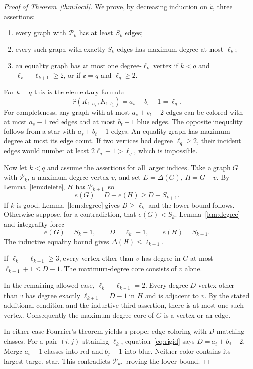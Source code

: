 \documentclass[11pt]{article}
\theoremstyle{remark}\newtheorem{remark}[theorem]{Remark}
\newcommand{\sr}{\widehat r}
\begin{document}
\begin{proof}[Proof of Theorem~\ref{thm:local}]
We prove, by decreasing induction on $k$, three assertions:
\begin{enumerate}
\item every graph with $\mathcal P_k$ has at least $S_k$ edges;
\item every such graph with exactly $S_k$ edges has maximum degree at most $\ell_k$;
\item an equality graph has at most one degree-$\ell_k$ vertex if $k<q$ and $\ell_k-\ell_{k+1}\ge2$, or if $k=q$ and $\ell_q\ge2$.
\end{enumerate}

For $k=q$ this is the elementary formula
\[
 \sr(K_{1,a_s},K_{1,b_t})=a_s+b_t-1=\ell_q.
\]
For completeness, any graph with at most $a_s+b_t-2$ edges can be colored with at most $a_s-1$ red edges and at most $b_t-1$ blue edges. The opposite inequality follows from a star with $a_s+b_t-1$ edges. An equality graph has maximum degree at most its edge count. If two vertices had degree $\ell_q\ge2$, their incident edges would number at least $2\ell_q-1>\ell_q$, which is impossible.

Now let $k<q$ and assume the assertions for all larger indices. Take a graph $G$ with $\mathcal P_k$, a maximum-degree vertex $v$, and set $D=\Delta(G)$, $H=G-v$. By Lemma~\ref{lem:delete}, $H$ has $\mathcal P_{k+1}$, so
\[
 e(G)=D+e(H)\ge D+S_{k+1}.
\]
If $k$ is good, Lemma~\ref{lem:degree} gives $D\ge\ell_k$ and the lower bound follows. Otherwise suppose, for a contradiction, that $e(G)<S_k$. Lemma~\ref{lem:degree} and integrality force
\begin{equation}\label{eq:rigid}
 e(G)=S_k-1,\qquad D=\ell_k-1,\qquad e(H)=S_{k+1}.
\end{equation}
The inductive equality bound gives $\Delta(H)\le\ell_{k+1}$.

If $\ell_k-\ell_{k+1}\ge3$, every vertex other than $v$ has degree in $G$ at most $\ell_{k+1}+1\le D-1$. The maximum-degree core consists of $v$ alone.

In the remaining allowed case, $\ell_k-\ell_{k+1}=2$. Every degree-$D$ vertex other than $v$ has degree exactly $\ell_{k+1}=D-1$ in $H$ and is adjacent to $v$. By the stated additional condition and the inductive third assertion, there is at most one such vertex. Consequently the maximum-degree core of $G$ is a vertex or an edge.

In either case Fournier's theorem yields a proper edge coloring with $D$ matching classes. For a pair $(i,j)$ attaining $\ell_k$, equation~\eqref{eq:rigid} says $D=a_i+b_j-2$. Merge $a_i-1$ classes into red and $b_j-1$ into blue. Neither color contains its largest target star. This contradicts $\mathcal P_k$, proving the lower bound.


\end{proof}
\end{document}
